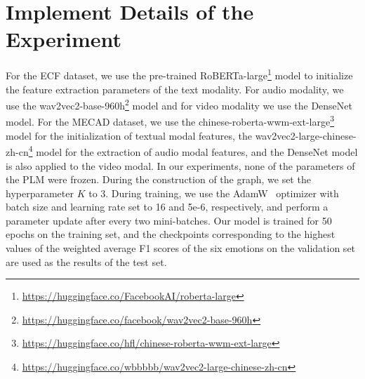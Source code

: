 \documentclass[11pt]{article}
\begin{document}
\section{Implement Details of the Experiment}
For the ECF dataset, we use the pre-trained RoBERTa-large\footnote{\url{https://huggingface.co/FacebookAI/roberta-large}} model to initialize the feature extraction parameters of the text modality.
For audio modality, we use the wav2vec2-base-960h\footnote{\url{https://huggingface.co/facebook/wav2vec2-base-960h}} model and for video modality we use the DenseNet~\cite{DenseNet} model.
For the MECAD dataset, we use the chinese-roberta-wwm-ext-large\footnote{\url{https://huggingface.co/hfl/chinese-roberta-wwm-ext-large}} model for the initialization of textual modal features, the wav2vec2-large-chinese-zh-cn\footnote{\url{https://huggingface.co/wbbbbb/wav2vec2-large-chinese-zh-cn}} model for the extraction of audio modal features, and the DenseNet model is also applied to the video modal.
In our experiments, none of the parameters of the PLM were frozen.
During the construction of the graph, we set the hyperparameter $K$ to 3.
During training, we use the AdamW~\cite{AdamW} optimizer with batch size and learning rate set to 16 and 5e-6, respectively, and perform a parameter update after every two mini-batches.
Our model is trained for 50 epochs on the training set, and the checkpoints corresponding to the highest values of the weighted average F1 scores of the six emotions on the validation set are used as the results of the test set.
\label{appendix-d}
\end{document}
